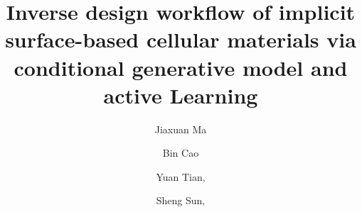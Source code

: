 \documentclass[preprint,review,12pt,authoryear]{elsarticle}
\begin{document}


\begin{frontmatter}



\title{Inverse design workflow of implicit surface-based cellular materials via conditional generative model and active Learning}


\author[1]{Jiaxuan Ma}
\author[3]{Bin Cao}
\author[1]{Yuan Tian, }
\author[1,2]{Sheng Sun, }


\address[1]{Materials Genome Institute, Shanghai University, Shanghai, 200444, China}
\address[2]{Shanghai Frontier Science Center of Mechanoinformatics, Shanghai University, Shanghai, 200444, China}
\address[3]{Advanced Materials Thrust, Hong Kong University of Science and Technology (Guangzhou), Guangzhou, 511400, Guangdong, China}



\end{frontmatter}
\end{document}
